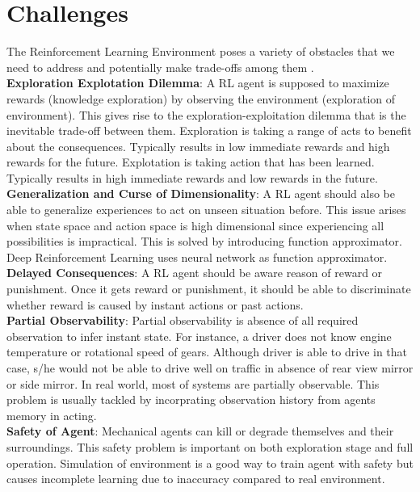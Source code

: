 \section{Challenges}
\label{sec:chal}
The Reinforcement Learning Environment poses a variety of obstacles that we need to address and potentially make trade-offs among them \cite{dulac-arnold_challenges_2019} \cite{sutton_reinforcement_1998}. \\
\textbf{Exploration Explotation Dilemma}: A RL agent is supposed to maximize rewards (knowledge exploration) by observing the environment (exploration of environment). This gives rise to the exploration-exploitation dilemma that is the inevitable trade-off between them. Exploration is taking a range of acts to benefit about the consequences. Typically results in low immediate rewards and high rewards for the future. Explotation is taking action that has been learned. Typically results in high immediate rewards and low rewards in the future. \\
\textbf{Generalization and Curse of Dimensionality}: A RL agent should also be able to generalize experiences to act on unseen situation before. This issue arises when state space and action space is high dimensional since experiencing all possibilities is impractical. This is solved by introducing function approximator. Deep Reinforcement Learning uses neural network as function approximator. \\
\textbf{Delayed Consequences}: A RL agent should be aware reason of reward or punishment. Once it gets reward or punishment, it should be able to discriminate whether reward is caused by instant actions or past actions. \\
\textbf{Partial Observability}: Partial observability is absence of all required observation to infer instant state. For instance, a driver does not know engine temperature or rotational speed of gears. Although driver is able to drive in that case, s/he would not be able to drive well on traffic in absence of rear view mirror or side mirror. In real world, most of systems are partially observable. This problem is usually tackled by incorprating observation history from agents memory in acting. \\
\textbf{Safety of Agent}: Mechanical agents can kill or degrade themselves and their surroundings. This safety problem is important on both exploration stage and full operation. Simulation of environment is a good way to train agent with safety but causes incomplete learning due to inaccuracy compared to real environment. \\